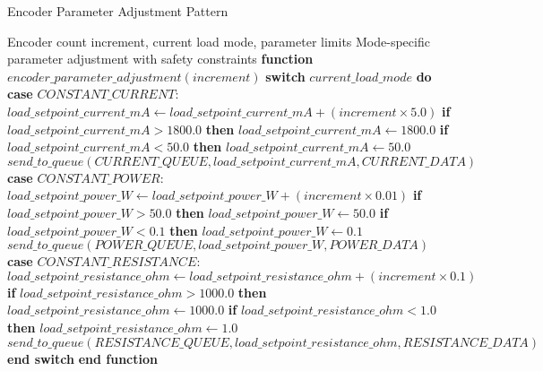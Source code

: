 \documentclass{article}
\begin{document}
\begin{algorithm}
\caption{Encoder Parameter Adjustment Pattern}
\label{alg:encoder_parameter_adjustment}
\begin{algorithmic}[1]
\REQUIRE Encoder count increment, current load mode, parameter limits
\ENSURE Mode-specific parameter adjustment with safety constraints
\STATE \textbf{function} $encoder\_parameter\_adjustment(increment)$
\STATE \textbf{switch} $current\_load\_mode$ \textbf{do}
    \STATE \textbf{case} $CONSTANT\_CURRENT$:
    \STATE \quad $load\_setpoint\_current\_mA \leftarrow load\_setpoint\_current\_mA + (increment \times 5.0)$
    \STATE \quad \textbf{if} $load\_setpoint\_current\_mA > 1800.0$ \textbf{then} $load\_setpoint\_current\_mA \leftarrow 1800.0$
    \STATE \quad \textbf{if} $load\_setpoint\_current\_mA < 50.0$ \textbf{then} $load\_setpoint\_current\_mA \leftarrow 50.0$
    \STATE \quad $send\_to\_queue(CURRENT\_QUEUE, load\_setpoint\_current\_mA, CURRENT\_DATA)$
    \STATE
    \STATE \textbf{case} $CONSTANT\_POWER$:
    \STATE \quad $load\_setpoint\_power\_W \leftarrow load\_setpoint\_power\_W + (increment \times 0.01)$
    \STATE \quad \textbf{if} $load\_setpoint\_power\_W > 50.0$ \textbf{then} $load\_setpoint\_power\_W \leftarrow 50.0$
    \STATE \quad \textbf{if} $load\_setpoint\_power\_W < 0.1$ \textbf{then} $load\_setpoint\_power\_W \leftarrow 0.1$
    \STATE \quad $send\_to\_queue(POWER\_QUEUE, load\_setpoint\_power\_W, POWER\_DATA)$
    \STATE
    \STATE \textbf{case} $CONSTANT\_RESISTANCE$:
    \STATE \quad $load\_setpoint\_resistance\_ohm \leftarrow load\_setpoint\_resistance\_ohm + (increment \times 0.1)$
    \STATE \quad \textbf{if} $load\_setpoint\_resistance\_ohm > 1000.0$ \textbf{then} $load\_setpoint\_resistance\_ohm \leftarrow 1000.0$
    \STATE \quad \textbf{if} $load\_setpoint\_resistance\_ohm < 1.0$ \textbf{then} $load\_setpoint\_resistance\_ohm \leftarrow 1.0$
    \STATE \quad $send\_to\_queue(RESISTANCE\_QUEUE, load\_setpoint\_resistance\_ohm, RESISTANCE\_DATA)$
\STATE \textbf{end switch}
\STATE \textbf{end function}
\end{algorithmic}
\end{algorithm}
\end{document}
